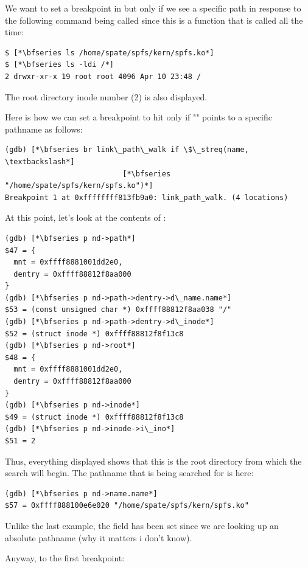 \noindent
We want to set a breakpoint in  but only if we see a specific path in response to the following command being called since this is a function that is called all the time:

\begin{lstlisting}
$ [*\bfseries ls /home/spate/spfs/kern/spfs.ko*]
$ [*\bfseries ls -ldi /*]
2 drwxr-xr-x 19 root root 4096 Apr 10 23:48 /
\end{lstlisting}

\noindent
The root directory inode number (2) is also displayed.

Here is how we can set a breakpoint to hit only if "" points to a specific pathname as follows:

\begin{lstlisting}
(gdb) [*\bfseries br link\_path\_walk if \$\_streq(name, \textbackslash*]
                           [*\bfseries "/home/spate/spfs/kern/spfs.ko")*]
Breakpoint 1 at 0xffffffff813fb9a0: link_path_walk. (4 locations)
\end{lstlisting}

\noindent
At this point, let's look at the contents of :

\begin{lstlisting}
(gdb) [*\bfseries p nd->path*]
$47 = {
  mnt = 0xffff8881001dd2e0,
  dentry = 0xffff88812f8aa000
}
(gdb) [*\bfseries p nd->path->dentry->d\_name.name*]
$53 = (const unsigned char *) 0xffff88812f8aa038 "/"
(gdb) [*\bfseries p nd->path->dentry->d\_inode*]
$52 = (struct inode *) 0xffff88812f8f13c8
(gdb) [*\bfseries p nd->root*]
$48 = {
  mnt = 0xffff8881001dd2e0,
  dentry = 0xffff88812f8aa000
}
(gdb) [*\bfseries p nd->inode*]
$49 = (struct inode *) 0xffff88812f8f13c8
(gdb) [*\bfseries p nd->inode->i\_ino*]
$51 = 2
\end{lstlisting}

\noindent
Thus, everything displayed shows that this is the root directory from which the search will begin. The pathname that is being searched for is here:

\begin{lstlisting}
(gdb) [*\bfseries p nd->name.name*]
$57 = 0xffff888100e6e020 "/home/spate/spfs/kern/spfs.ko"
\end{lstlisting}

\noindent
Unlike the last example, the  field has been set since we are looking up an absolute pathname (why it matters i don't know).

Anyway, to the first breakpoint:

